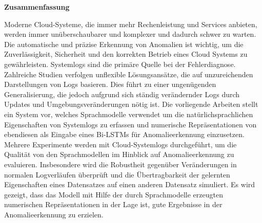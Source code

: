 \thispagestyle{empty}
\vspace*{0.2cm}

\begin{center}
    \textbf{Zusammenfassung}
\end{center}
Moderne Cloud-Systeme, die immer mehr Rechenleistung und Services anbieten, werden immer unüberschaubarer und komplexer und dadurch schwer zu warten. Die automatische und präzise Erkennung von Anomalien ist wichtig, um die Zuverlässigkeit, Sicherheit und den korrekten Betrieb eines Cloud Systems zu gewährleisten. Systemlogs sind die primäre Quelle bei der Fehlerdiagnose. Zahlreiche Studien verfolgen unflexible Lösungsansätze, die auf unzureichenden Darstellungen von Logs basieren. Dies führt zu einer ungenügenden Generalisierung, die jedoch aufgrund sich ständig verändernder Logs durch Updates und Umgebungsveränderungen nötig ist. Die vorliegende Arbeiten stellt ein System vor, welches Sprachmodelle verwendet um die natürlichsprachlichen Eigenschaften von Systemlogs zu erfassen und numerische Repräsentationen von ebendiesen als Eingabe eines Bi-LSTMs für Anomalieerkennung einzusetzen. Mehrere Experimente werden mit Cloud-Systemlogs durchgeführt, um die Qualität von den Sprachmodellen im Hinblick auf Anomalieerkennung zu evaluieren. Insbesondere wird die Robustheit gegenüber Veränderungen in normalen Logverläufen überprüft und die Übertragbarkeit der gelernten Eigenschaften eines Datensatzes auf einen anderen Datensatz simuliert. Es wird gezeigt, dass das Modell mit Hilfe der durch Sprachmodelle erzeugten numerischen Repräsentationen in der Lage ist, gute Ergebnisse in der Anomalieerkennung zu erzielen.
\vspace*{0.2cm}

\noindent 
